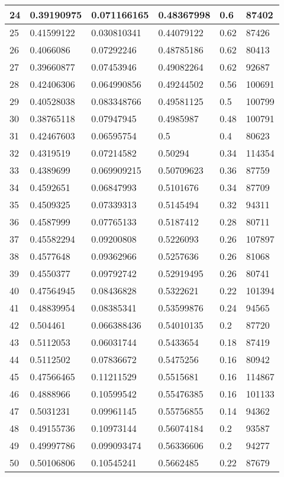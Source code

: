 \begin{longtable}{|l|l|l|l|l|l|}
24 & 0.39190975 & 0.071166165 & 0.48367998 & 0.6 & 87402 \\ \hline 
25 & 0.41599122 & 0.030810341 & 0.44079122 & 0.62 & 87426 \\ \hline 
26 & 0.4066086 & 0.07292246 & 0.48785186 & 0.62 & 80413 \\ \hline 
27 & 0.39660877 & 0.07453946 & 0.49082264 & 0.62 & 92687 \\ \hline 
28 & 0.42406306 & 0.064990856 & 0.49244502 & 0.56 & 100691 \\ \hline 
29 & 0.40528038 & 0.083348766 & 0.49581125 & 0.5 & 100799 \\ \hline 
30 & 0.38765118 & 0.07947945 & 0.4985987 & 0.48 & 100791 \\ \hline 
31 & 0.42467603 & 0.06595754 & 0.5 & 0.4 & 80623 \\ \hline 
32 & 0.4319519 & 0.07214582 & 0.50294 & 0.34 & 114354 \\ \hline 
33 & 0.4389699 & 0.069909215 & 0.50709623 & 0.36 & 87759 \\ \hline 
34 & 0.4592651 & 0.06847993 & 0.5101676 & 0.34 & 87709 \\ \hline 
35 & 0.4509325 & 0.07339313 & 0.5145494 & 0.32 & 94311 \\ \hline 
36 & 0.4587999 & 0.07765133 & 0.5187412 & 0.28 & 80711 \\ \hline 
37 & 0.45582294 & 0.09200808 & 0.5226093 & 0.26 & 107897 \\ \hline 
38 & 0.4577648 & 0.09362966 & 0.5257636 & 0.26 & 81068 \\ \hline 
39 & 0.4550377 & 0.09792742 & 0.52919495 & 0.26 & 80741 \\ \hline 
40 & 0.47564945 & 0.08436828 & 0.5322621 & 0.22 & 101394 \\ \hline 
41 & 0.48839954 & 0.08385341 & 0.53599876 & 0.24 & 94565 \\ \hline 
42 & 0.504461 & 0.066388436 & 0.54010135 & 0.2 & 87720 \\ \hline 
43 & 0.5112053 & 0.06031744 & 0.5433654 & 0.18 & 87419 \\ \hline 
44 & 0.5112502 & 0.07836672 & 0.5475256 & 0.16 & 80942 \\ \hline 
45 & 0.47566465 & 0.11211529 & 0.5515681 & 0.16 & 114867 \\ \hline 
46 & 0.4888966 & 0.10599542 & 0.55476385 & 0.16 & 101133 \\ \hline 
47 & 0.5031231 & 0.09961145 & 0.55756855 & 0.14 & 94362 \\ \hline 
48 & 0.49155736 & 0.10973144 & 0.56074184 & 0.2 & 93587 \\ \hline 
49 & 0.49997786 & 0.099093474 & 0.56336606 & 0.2 & 94277 \\ \hline 
50 & 0.50106806 & 0.10545241 & 0.5662485 & 0.22 & 87679 \\ \hline 
\end{longtable}